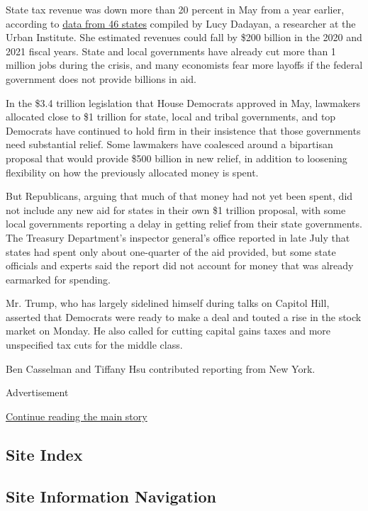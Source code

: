State tax revenue was down more than 20 percent in May from a year
earlier, according to
\href{https://www.urban.org/sites/default/files/2020/07/01/monthlystrh_may2020.pdf}{data
from 46 states} compiled by Lucy Dadayan, a researcher at the Urban
Institute. She estimated revenues could fall by \$200 billion in the
2020 and 2021 fiscal years. State and local governments have already cut
more than 1 million jobs during the crisis, and many economists fear
more layoffs if the federal government does not provide billions in aid.

In the \$3.4 trillion legislation that House Democrats approved in May,
lawmakers allocated close to \$1 trillion for state, local and tribal
governments, and top Democrats have continued to hold firm in their
insistence that those governments need substantial relief. Some
lawmakers have coalesced around a bipartisan proposal that would provide
\$500 billion in new relief, in addition to loosening flexibility on how
the previously allocated money is spent.

But Republicans, arguing that much of that money had not yet been spent,
did not include any new aid for states in their own \$1 trillion
proposal, with some local governments reporting a delay in getting
relief from their state governments. The Treasury Department's inspector
general's office reported in late July that states had spent only about
one-quarter of the aid provided, but some state officials and experts
said the report did not account for money that was already earmarked for
spending.

Mr. Trump, who has largely sidelined himself during talks on Capitol
Hill, asserted that Democrats were ready to make a deal and touted a
rise in the stock market on Monday. He also called for cutting capital
gains taxes and more unspecified tax cuts for the middle class.

Ben Casselman and Tiffany Hsu contributed reporting from New York.

Advertisement

\protect\hyperlink{after-bottom}{Continue reading the main story}

\hypertarget{site-index}{%
\subsection{Site Index}\label{site-index}}

\hypertarget{site-information-navigation}{%
\subsection{Site Information
Navigation}\label{site-information-navigation}}

